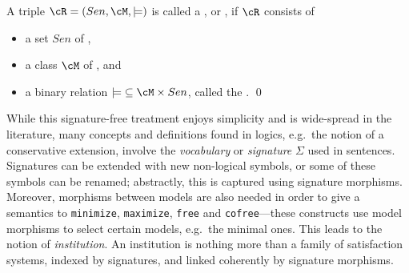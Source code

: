 \documentclass[10pt,fleqn,final]{scrreprt}
\newcommand*{\syntax}[1]{\texttt{#1}}
\newenvironment{definitions}[0]{\medskip }{}
\providecommand{\DIFadd}[1]{{\protect\color{blue}\uwave{#1}}} %
\providecommand{\DIFdel}[1]{{\protect\color{red}\sout{#1}}}                      %
\providecommand{\DIFaddbegin}{} %
\providecommand{\DIFaddend}{} %
\providecommand{\DIFdelbegin}{} %
\providecommand{\DIFdelend}{} %
\begin{document}
\begin{definitions}
\begin{definition}\label{def:room}
A triple \DIFdelbegin \DIFdel{$\cR=(Sen,{\cM,\models)}$  }\DIFdelend \DIFaddbegin \DIFadd{$\cR=(\mathit{Sen},{\cM,\models)}$  }\DIFaddend is called a , or , if $\cR$ consists of
\begin{itemize}
\item a set \DIFdelbegin \DIFdel{$Sen$ }\DIFdelend \DIFaddbegin \DIFadd{$\mathit{Sen}$ }\DIFaddend of ,
\item a class
$\cM$ of , and
\item a binary relation
\DIFdelbegin \DIFdel{${\models}\subseteq \cM \times Sen$}\DIFdelend \DIFaddbegin \DIFadd{${\models} \subseteq \cM \times \mathit{Sen}$}\DIFaddend , called the .\DIFdelbegin %
\DIFdelend \DIFaddbegin \quad\DIFaddend \qed
\DIFaddbegin \end{itemize}
\DIFaddend \end{definition}


While this signature-free treatment enjoys simplicity and is wide-spread in the literature, many 
concepts and definitions found in logics, e.g.\ the notion of a conservative extension, involve the
\emph{vocabulary} or \emph{signature} $\Sigma$ \label{vocabulary} used in sentences.  Signatures 
can be extended with new non-logical symbols, or some of these symbols can be renamed; abstractly, 
this is captured using signature morphisms. Moreover,  morphisms
between models are also needed in order to give a semantics to \syntax{minimize},
\syntax{maximize}, \syntax{free} and \syntax{cofree}---these constructs
use model morphisms to select certain models, e.g.\ the minimal ones.
This leads to the notion of \emph{institution}. An institution
is nothing more than a family of satisfaction systems, indexed by
signatures, and linked coherently by signature morphisms.



\end{definitions}
\end{document}
